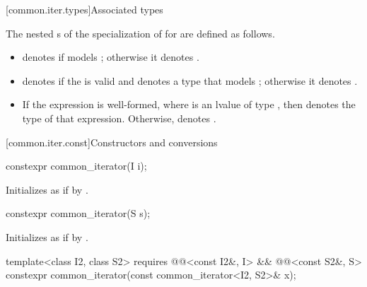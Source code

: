 [common.iter.types]{Associated types}

\pnum
The nested s of the specialization of
 for  are defined as follows.
\begin{itemize}
\item
{} denotes 
if  models ;
otherwise it denotes .

\item
{} denotes
if the  
is valid and denotes a type that
models ;
otherwise it denotes .

\item
If the expression  is well-formed,
where  is an lvalue of type ,
then  denotes the type of that expression.
Otherwise,  denotes .
\end{itemize}

[common.iter.const]{Constructors and conversions}

%
\begin{itemdecl}
constexpr common_iterator(I i);
\end{itemdecl}

\begin{itemdescr}
\pnum
\effects
Initializes  as if by .
\end{itemdescr}

%
\begin{itemdecl}
constexpr common_iterator(S s);
\end{itemdecl}

\begin{itemdescr}
\pnum
\effects
Initializes  as if by
.
\end{itemdescr}

%
\begin{itemdecl}
template<class I2, class S2>
  requires @@<const I2&, I> && @@<const S2&, S>
    constexpr common_iterator(const common_iterator<I2, S2>& x);
\end{itemdecl}

